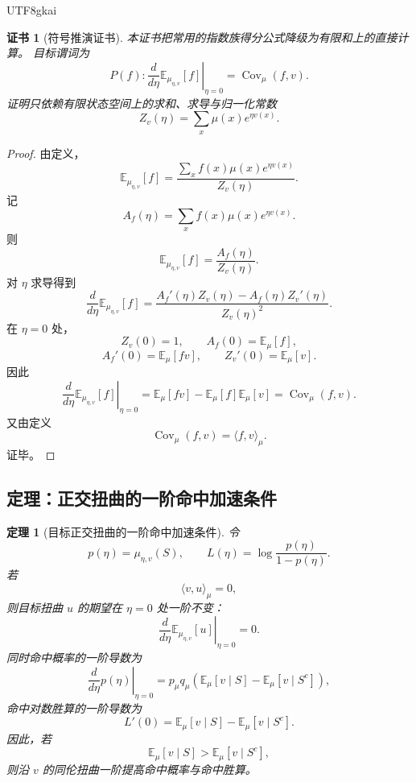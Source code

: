 \documentclass[12pt]{article}
\newtheorem{theorem}{定理}[section]
\newtheorem{Certificate}{证书}[section]
\begin{document}
\begin{CJK*}{UTF8}{gkai}
\begin{Certificate}[符号推演证书]
\label{cert:tex55-exponential-twist-derivative}
本证书把常用的指数族得分公式降级为有限和上的直接计算。
目标谓词为
\[
  P(f):
  \left.
  \frac{d}{d\eta}
  \mathbb E_{\mu_{\eta,v}}[f]
  \right|_{\eta=0}
  =
  \operatorname{Cov}_\mu(f,v).
\]
证明只依赖有限状态空间上的求和、求导与归一化常数
\[
  Z_v(\eta)=\sum_x\mu(x)e^{\eta v(x)}.
\]
\end{Certificate}

\begin{proof}
由定义，
\[
  \mathbb E_{\mu_{\eta,v}}[f]
  =
  \frac{
  \sum_x f(x)\mu(x)e^{\eta v(x)}
  }{
  Z_v(\eta)
  }.
\]
记
\[
  A_f(\eta)=\sum_x f(x)\mu(x)e^{\eta v(x)}.
\]
则
\[
  \mathbb E_{\mu_{\eta,v}}[f]
  =
  \frac{A_f(\eta)}{Z_v(\eta)}.
\]
对 \(\eta\) 求导得到
\[
  \frac{d}{d\eta}
  \mathbb E_{\mu_{\eta,v}}[f]
  =
  \frac{A_f'(\eta)Z_v(\eta)-A_f(\eta)Z_v'(\eta)}{Z_v(\eta)^2}.
\]
在 \(\eta=0\) 处，
\[
  Z_v(0)=1,
  \qquad
  A_f(0)=\mathbb E_\mu[f],
\]
\[
  A_f'(0)=\mathbb E_\mu[fv],
  \qquad
  Z_v'(0)=\mathbb E_\mu[v].
\]
因此
\[
  \left.
  \frac{d}{d\eta}
  \mathbb E_{\mu_{\eta,v}}[f]
  \right|_{\eta=0}
  =
  \mathbb E_\mu[fv]
  -
  \mathbb E_\mu[f]\mathbb E_\mu[v]
  =
  \operatorname{Cov}_\mu(f,v).
\]
又由定义
\[
  \operatorname{Cov}_\mu(f,v)=\langle f,v\rangle_\mu.
\]
证毕。
\end{proof}

\subsection{定理：正交扭曲的一阶命中加速条件}
\label{subsec:tex55-orthogonal-first-order}

\begin{theorem}[目标正交扭曲的一阶命中加速条件]
\label{thm:tex55-orthogonal-first-order-hit}
令
\[
  p(\eta)=\mu_{\eta,v}(S),
  \qquad
  L(\eta)=\log\frac{p(\eta)}{1-p(\eta)}.
\]
若
\[
  \langle v,u\rangle_\mu=0,
\]
则目标扭曲 \(u\) 的期望在 \(\eta=0\) 处一阶不变：
\[
  \left.
  \frac{d}{d\eta}
  \mathbb E_{\mu_{\eta,v}}[u]
  \right|_{\eta=0}
  =
  0.
\]
同时命中概率的一阶导数为
\[
  \left.
  \frac{d}{d\eta}
  p(\eta)
  \right|_{\eta=0}
  =
  p_\mu q_\mu
  \left(
  \mathbb E_\mu[v\mid S]
  -
  \mathbb E_\mu[v\mid S^c]
  \right),
\]
命中对数胜算的一阶导数为
\[
  L'(0)
  =
  \mathbb E_\mu[v\mid S]
  -
  \mathbb E_\mu[v\mid S^c].
\]
因此，若
\[
  \mathbb E_\mu[v\mid S]
  >
  \mathbb E_\mu[v\mid S^c],
\]
则沿 \(v\) 的同伦扭曲一阶提高命中概率与命中胜算。
\end{theorem}


\end{CJK*}
\end{document}
